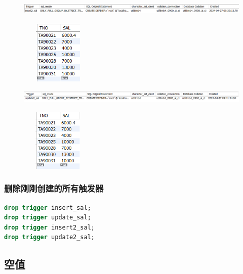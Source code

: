 \documentclass{ctexart}
\begin{document}
\begin{figure}[H]
	\centering 
	\includegraphics[height=0.6cm,width=16cm]{55.png}
	\end{figure}
	\begin{figure}[H]
		\centering 
		\includegraphics[height=3cm,width=3.5cm]{56.png}
		\end{figure}
		\begin{figure}[H]
			\centering 
			\includegraphics[height=0.6cm,width=16cm]{62.png}
			\end{figure}
			\begin{figure}[H]
				\centering 
				\includegraphics[height=3cm,width=3.5cm]{57.png}
				\end{figure}
\subsubsection{删除刚刚创建的所有触发器}
\begin{lstlisting}[language=sql]
drop trigger insert_sal;
drop trigger update_sal;
drop trigger insert2_sal;
drop trigger update2_sal;

\end{lstlisting}
\subsection{空值}
\end{document}
